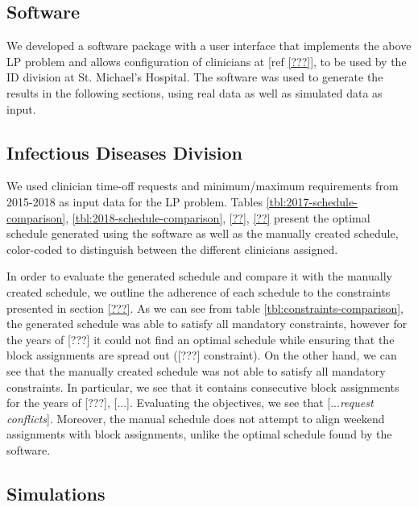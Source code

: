 \subsection{Software}
We developed a software package with a user interface that implements the above LP problem and allows configuration of clinicians at [ref \ref{???}], to be used by the ID division at St. Michael's Hospital. The software was used to generate the results in the following sections, using real data as well as simulated data as input.

\subsection{Infectious Diseases Division}
We used clinician time-off requests and minimum/maximum requirements from 2015-2018 as input data for the LP problem. Tables \ref{tbl:2017-schedule-comparison}, \ref{tbl:2018-schedule-comparison}, \ref{??}, \ref{??} present the optimal schedule generated using the software as well as the manually created schedule, color-coded to distinguish between the different clinicians assigned.




In order to evaluate the generated schedule and compare it with the manually created schedule, we outline the adherence of each schedule to the constraints presented in section \ref{???}. As we can see from table \ref{tbl:constraints-comparison}, the generated schedule was able to satisfy all mandatory constraints, however for the years of [???] it could not find an optimal schedule while ensuring that the block assignments are spread out ([???] constraint). On the other hand, we can see that the manually created schedule was not able to satisfy all mandatory constraints. In particular, we see that it contains consecutive block assignments for the years of [???], [...]. Evaluating the objectives, we see that [...\textit{request conflicts}]. Moreover, the manual schedule does not attempt to align weekend assignments with block assignments, unlike the optimal schedule found by the software.



\subsection{Simulations}